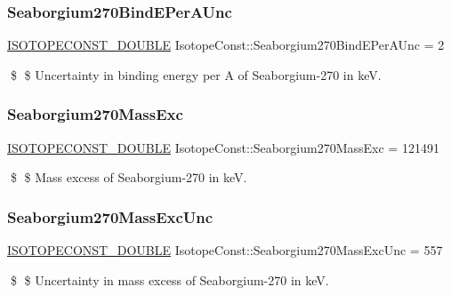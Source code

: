 \subsubsection{\texorpdfstring{Seaborgium270\+Bind\+E\+Per\+A\+Unc}{Seaborgium270BindEPerAUnc}}
{\footnotesize\ttfamily \mbox{\hyperlink{group___isotope_const-_macros_ga8f45a7272ce02c0b4c65c44636ed719a}{I\+S\+O\+T\+O\+P\+E\+C\+O\+N\+S\+T\+\_\+\+D\+O\+U\+B\+LE}} Isotope\+Const\+::\+Seaborgium270\+Bind\+E\+Per\+A\+Unc = 2}

\$ \$ Uncertainty in binding energy per A of Seaborgium-\/270 in keV. \mbox{\label{group___isotope_const-_seaborgium-_sg270_gaf67848aa0f027cfb8b16b014e5b3a3af}} 
\subsubsection{\texorpdfstring{Seaborgium270\+Mass\+Exc}{Seaborgium270MassExc}}
{\footnotesize\ttfamily \mbox{\hyperlink{group___isotope_const-_macros_ga8f45a7272ce02c0b4c65c44636ed719a}{I\+S\+O\+T\+O\+P\+E\+C\+O\+N\+S\+T\+\_\+\+D\+O\+U\+B\+LE}} Isotope\+Const\+::\+Seaborgium270\+Mass\+Exc = 121491}

\$ \$ Mass excess of Seaborgium-\/270 in keV. \mbox{\label{group___isotope_const-_seaborgium-_sg270_gacc8c35cfd4765e68334b83bcb4ffbbac}} 
\subsubsection{\texorpdfstring{Seaborgium270\+Mass\+Exc\+Unc}{Seaborgium270MassExcUnc}}
{\footnotesize\ttfamily \mbox{\hyperlink{group___isotope_const-_macros_ga8f45a7272ce02c0b4c65c44636ed719a}{I\+S\+O\+T\+O\+P\+E\+C\+O\+N\+S\+T\+\_\+\+D\+O\+U\+B\+LE}} Isotope\+Const\+::\+Seaborgium270\+Mass\+Exc\+Unc = 557}

\$ \$ Uncertainty in mass excess of Seaborgium-\/270 in keV. \mbox{\label{group___isotope_const-_seaborgium-_sg270_gad7270b8be6637bb0cdd50d27e4cf931e}} 
